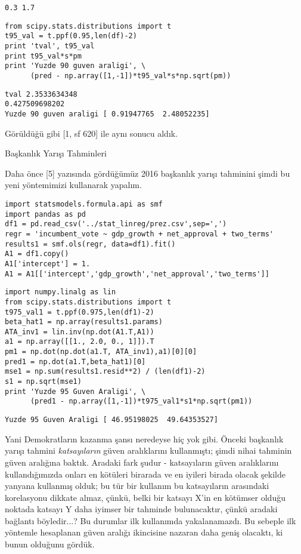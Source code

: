 \documentclass[12pt,fleqn]{article}\usepackage{../../common}
\begin{document}
\begin{verbatim}
0.3 1.7
\end{verbatim}

\begin{verbatim}
from scipy.stats.distributions import t
t95_val = t.ppf(0.95,len(df)-2)
print 'tval', t95_val
print t95_val*s*pm
print 'Yuzde 90 guven araligi', \
      (pred - np.array([1,-1])*t95_val*s*np.sqrt(pm))
\end{verbatim}

\begin{verbatim}
tval 2.3533634348
0.427509698202
Yuzde 90 guven araligi [ 0.91947765  2.48052235]
\end{verbatim}

Görüldüğü gibi [1, sf 620] ile aynı sonucu aldık.

Başkanlık Yarışı Tahminleri

Daha önce [5] yazısında gördüğümüz 2016 başkanlık yarışı tahminini şimdi bu
yeni yöntemimizi kullanarak yapalım.

\begin{verbatim}
import statsmodels.formula.api as smf
import pandas as pd
df1 = pd.read_csv('../stat_linreg/prez.csv',sep=',')
regr = 'incumbent_vote ~ gdp_growth + net_approval + two_terms'
results1 = smf.ols(regr, data=df1).fit()
A1 = df1.copy()
A1['intercept'] = 1.
A1 = A1[['intercept','gdp_growth','net_approval','two_terms']]
\end{verbatim}

\begin{verbatim}
import numpy.linalg as lin
from scipy.stats.distributions import t
t975_val1 = t.ppf(0.975,len(df1)-2)
beta_hat1 = np.array(results1.params)
ATA_inv1 = lin.inv(np.dot(A1.T,A1))
a1 = np.array([[1., 2.0, 0., 1]]).T
pm1 = np.dot(np.dot(a1.T, ATA_inv1),a1)[0][0]
pred1 = np.dot(a1.T,beta_hat1)[0]
mse1 = np.sum(results1.resid**2) / (len(df1)-2)
s1 = np.sqrt(mse1)
print 'Yuzde 95 Guven Araligi', \
      (pred1 - np.array([1,-1])*t975_val1*s1*np.sqrt(pm1))
\end{verbatim}

\begin{verbatim}
Yuzde 95 Guven Araligi [ 46.95198025  49.64353527]
\end{verbatim}

Yani Demokratların kazanma şansı neredeyse hiç yok gibi. Önceki başkanlık
yarışı tahmini {\em katsayıların} güven aralıklarını kullanmıştı; şimdi
nihai tahminin güven aralığına baktık. Aradaki fark şudur - katsayıların
güven aralıklarını kullandığımızda onları en kötüleri birarada ve en
iyileri birada olacak şekilde yanyana kullanmış olduk; bu tür bir kullanım
bu katsayıların arasındaki korelasyonu dikkate almaz, çünkü, belki bir
katsayı X'in en kötümser olduğu noktada katsayı Y daha iyimser bir tahminde
bulunacaktır, çünkü aradaki bağlantı böyledir...? Bu durumlar ilk
kullanımda yakalanamazdı.  Bu sebeple ilk yöntemle hesaplanan güven aralığı
ikincisine nazaran daha geniş olacaktı, ki bunun olduğunu gördük.
\end{document}
